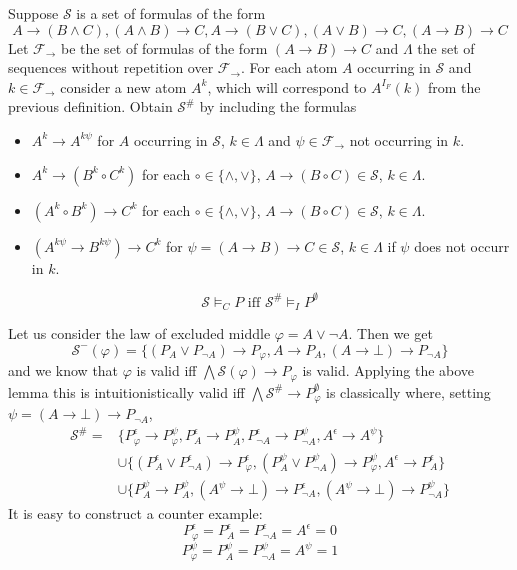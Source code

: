 \documentclass[a4paper,UKenglish,cleveref, autoref, thm-restate]{lipics-v2021}
\begin{document}
\begin{definition}
	Suppose $\mathcal S$ is a set of formulas of the form
	$$A\to (B\wedge C), (A\wedge B)\to C, A\to (B\vee C),(A\vee B)\to C, (A\to B)\to C$$
	Let $\mathcal F_\to$ be the set of formulas of the form $(A\to B)\to C$ and $\Lambda$ the set of sequences without repetition over $\mathcal F_\to$. For each atom $A$ occurring in $\mathcal S$ and $k\in \mathcal F_\to$ consider a new atom $A^{k}$, which will correspond to $A^{I_F}(k)$ from the previous definition. Obtain $\mathcal S^\#$ by including the formulas
	\begin{itemize}
		\item $A^k\to A^{k\psi}$ for $A$ occurring in $\mathcal S$, $k\in\Lambda$ and $\psi\in\mathcal F_\to$ not occurring in $k$.
		\item $A^k\to (B^k\circ C^k)$ for each $\circ\in\{\wedge,\vee\}$, $A\to (B\circ C)\in\mathcal S$, $k\in\Lambda$.
		\item $(A^k\circ B^k)\to C^k$ for each $\circ\in\{\wedge,\vee\}$, $A\to (B\circ C)\in\mathcal S$, $k\in\Lambda$.
		\item $(A^{k\psi}\to B^{k\psi})\to C^k$ for $\psi = (A\to B)\to C\in\mathcal S$, $k\in\Lambda$ if $\psi$ does not occurr in $k$.
	\end{itemize}
\end{definition}

\begin{theorem}
	$$\mathcal S\models_C P\text{ iff }\mathcal S^\#\models_I P^\emptyset$$
\end{theorem}

\begin{example}
	Let us consider the law of excluded middle $\varphi = A\vee\neg A$. Then we get
	$$\mathcal S^-(\varphi) = \{(P_A\vee P_{\neg A})\to P_\varphi, A\to P_A, (A\to \bot)\to P_{\neg A}\}$$
	and we know that $\varphi$ is valid iff $\bigwedge \mathcal S(\varphi)\to P_\varphi$ is valid. Applying the above lemma this is intuitionistically valid iff $\bigwedge\mathcal S^\#\to P^\emptyset_\varphi$ is classically where, setting $\psi = (A\to \bot)\to P_{\neg A}$,
	\begin{align*}
		\mathcal S^\# =&\{P_\varphi^\epsilon\to P_\varphi^{\psi}, P_A^\epsilon\to P_A^{\psi},P_{\neg A}^\epsilon\to P_{\neg A}^{\psi},A^\epsilon\to A^{\psi}\}\\ &\cup\{(P_A^\epsilon\vee P_{\neg A}^\epsilon)\to P_\varphi^\epsilon, (P_A^{\psi}\vee P_{\neg A}^{\psi})\to P_\varphi^{\psi},  A^\epsilon\to P_A^\epsilon\}\\ &\cup \{P_A^{\psi}\to P_A^{\psi}, (A^{\psi}\to \bot)\to P_{\neg A}^\epsilon, (A^{\psi}\to \bot)\to P_{\neg A}^{\psi}\}
	\end{align*}
	It is easy to construct a counter example:
	$$P_\varphi^\epsilon  = P_A^\epsilon = P_{\neg A}^\epsilon = A^\epsilon = 0$$
	$$P_{\varphi}^{\psi} = P_A^{\psi} =  P_{\neg A}^{\psi} = A^{\psi} = 1$$
\end{example}	
\end{document}
